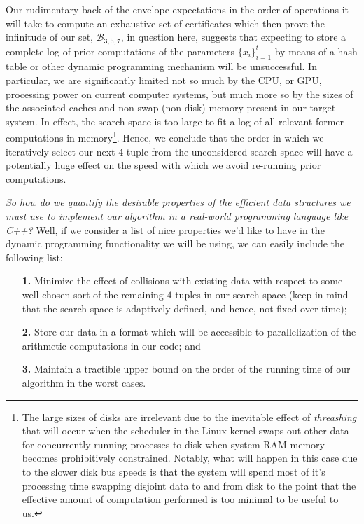 \documentclass[12pt]{article}
\begin{document}
Our rudimentary back-of-the-envelope expectations in the order of operations it will take to compute an 
exhaustive set of certificates which then prove the infinitude of our set, $\mathcal{B}_{3,5,7}$, in question 
here, suggests that expecting to store a complete log of prior computations of the parameters 
$\{x_i\}_{i=1}^t$ by means of a hash table or other dynamic programming mechanism will be unsuccessful. 
In particular, we are significantly limited not so much by the CPU, or GPU, processing power on 
current computer systems, but much more so by the sizes of the associated caches and non-swap (non-disk) 
memory present in our target system. In effect, the search space is too large to fit a log of all 
relevant former computations in memory\footnote{ 
     The large sizes of disks are irrelevant due to the inevitable effect of 
     \emph{threashing} that will occur when the scheduler in the Linux kernel 
     swaps out other data for concurrently running processes to disk when system RAM memory becomes 
     prohibitively constrained. Notably, what will happen in this case due to the slower disk bus speeds 
     is that the system will spend most of it's processing time swapping disjoint data to and from disk 
     to the point that 
     the effective amount of computation performed is too minimal to be useful to us.
}. Hence, we conclude that the order in which we iteratively select our next $4$-tuple from the 
unconsidered search space will have a potentially huge effect on the speed with which we avoid re-running 
prior computations. 

\emph{So how do we quantify the desirable properties of the efficient data structures we must use to 
implement our algorithm in a real-world programming language like C++?} Well, if we consider a list of 
nice properties we'd like to have in the dynamic programming functionality we will be using, we can easily 
include the following list: 
\begin{itemize} 

\item[\textbf{1.}]
Minimize the effect of collisions with existing data with respect to some well-chosen 
sort of the remaining $4$-tuples in our search space (keep in mind that the search space is adaptively 
defined, and hence, not fixed over time); 
\item[\textbf{2.}]
Store our data in a format which will be accessible to parallelization of the arithmetic 
computations in our code; and 
\item[\textbf{3.}]
Maintain a tractible upper bound on the order of the running time of our algorithm in the worst cases. 
\end{itemize} 
\end{document}
